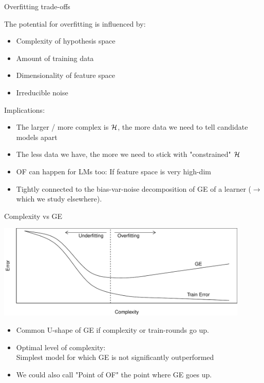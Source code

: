 \begin{vbframe}{Overfitting trade-offs}

The potential for overfitting is influenced by:
\begin{itemize}
  \item Complexity of hypothesis space
  \item Amount of training data
  \item Dimensionality of feature space
  \item Irreducible noise 
\end{itemize}
\lz
Implications:
\begin{itemize}
\item The larger / more complex is $\mathcal{H}$, 
    the more data we need to tell candidate models apart
\item The less data we have, the more we need to stick with "constrained" $\mathcal{H}$
\item OF can happen for LMs too: If feature space is very high-dim
\item Tightly connected to the bias-var-noise decomposition of GE
of a learner ($\rightarrow$ which we study elsewhere).
\end{itemize}
\end{vbframe}


\begin{vbframe}{Complexity vs GE}

\begin{center}
\includegraphics[width = 0.9\textwidth]{figure/eval_ofit_3} 
\end{center}


\vfill

\begin{itemize}
\item Common U-shape of GE if complexity or train-rounds go up.
\item Optimal level of complexity:\\
    Simplest model for which GE is not significantly outperformed
\item We could also call "Point of OF" the point where GE goes up. 
\end{itemize}

\end{vbframe}

